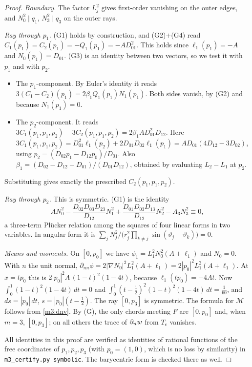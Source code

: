 \begin{proof}
\emph{Boundary.} The factor $L_j^2$ gives first-order vanishing on the outer edges, and $N_0^2\mid q_1$, $N_3^2\mid q_3$ on the outer rays.

\emph{Ray through $p_1$.} (G1) holds by construction, and (G2)$+$(G4) read $C_1(p_1)=C_2(p_1)=-Q_1(p_1)=-AD_{01}^2$. This holds since $\ell_1(p_1)=-A$ and $N_0(p_1)=D_{01}$. (G3) is an identity between two vectors, so we test it with $p_1$ and with $p_2$.
\begin{itemize}
\item The $p_1$-component. By Euler's identity it reads $3(C_1-C_2)(p_1)=2\beta_1Q_1(p_1)N_1(p_1)$. Both sides vanish, by (G2) and because $N_1(p_1)=0$.
\item The $p_2$-component. It reads $3C_1(p_1,p_1,p_2)-3C_2(p_1,p_1,p_2)=2\beta_1AD_{01}^2D_{12}$. Here $3C_1(p_1,p_1,p_2)=D_{01}^2\ell_1(p_2)+2D_{01}D_{02}\ell_1(p_1)=AD_{01}(4D_{12}-3D_{02})$, using $p_2=(D_{02}p_1-D_{12}p_0)/D_{01}$. Also $\beta_1=(D_{02}-D_{12}-D_{01})/(D_{01}D_{12})$, obtained by evaluating $L_2-L_1$ at $p_2$.
\end{itemize}
Substituting gives exactly the prescribed $C_2(p_1,p_1,p_2)$.

\emph{Ray through $p_2$.} This is symmetric. (G1) is the identity
\begin{equation}\label{m3:plucker}
AN_0^2-\frac{D_{02}D_{03}D_{23}}{D_{12}}N_1^2+\frac{D_{01}D_{03}D_{13}}{D_{12}}N_2^2-A_3N_3^2\equiv0,
\end{equation}
a three-term Pl\"ucker relation among the squares of four linear forms in two variables. In angular form it is $\sum_j N_j^2/\bigl(r_j^2\prod_{k\ne j}\sin(\vartheta_j-\vartheta_k)\bigr)=0$.

\emph{Means and moments.} On $[0,p_0]$ we have $\phi_1=L_1^2N_0^2(A+\ell_1)$ and $N_0=0$. With $n$ the unit normal, $\partial_{nn}\phi=2|\nabla N_0|^2L_1^2(A+\ell_1)=2|p_0|^2L_1^2(A+\ell_1)$. At $x=tp_0$ this is $2|p_0|^2A\,(1-t)^2(1-4t)$, because $\ell_1(tp_0)=-4At$. Now $\int_0^1(1-t)^2(1-4t)\,dt=0$ and $\int_0^1(t-\frac12)^2(1-t)^2(1-4t)\,dt=\frac1{60}$, and $ds=|p_0|\,dt$, $s=|p_0|(t-\frac12)$. The ray $[0,p_3]$ is symmetric. The formula for $\mathcal M$ follows from \eqref{m3:dnv}. By (G), the only chords meeting $F$ are $[0,p_0]$ and, when $m=3$, $[0,p_3]$; on all others the trace of $\partial_n w$ from $T_e$ vanishes.

All identities in this proof are verified as identities of rational functions of the free coordinates of $p_1,p_2,p_3$ (with $p_0=(1,0)$, which is no loss by similarity) in \texttt{m3\_certify.py symbolic}. The barycentric form is checked there as well.
\end{proof}

